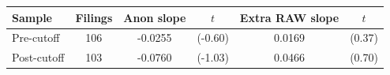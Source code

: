 \begin{tabular}{lccccc}
\toprule
Sample & Filings & Anon slope & $t$ & Extra RAW slope & $t$ \\
\midrule
Pre-cutoff & 106 & -0.0255 & (-0.60) & 0.0169 & (0.37) \\
Post-cutoff & 103 & -0.0760 & (-1.03) & 0.0466 & (0.70) \\
\bottomrule
\end{tabular}